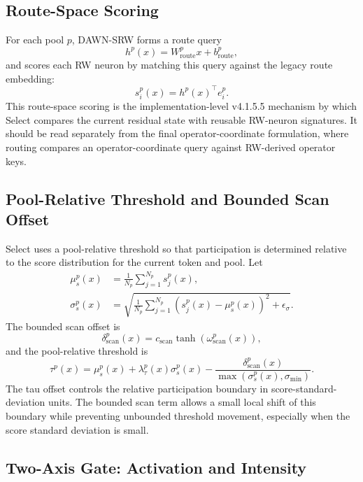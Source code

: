 \documentclass{article}
\begin{document}
\subsection{Route-Space Scoring}

For each pool $p$, DAWN-SRW forms a route query
\begin{equation}
    h^p(x)=W^p_{\mathrm{route}}x+b^p_{\mathrm{route}},
\end{equation}
and scores each RW neuron by matching this query against the legacy route embedding:
\begin{equation}
    s_i^p(x)=h^p(x)^\top e_i^p .
\end{equation}
This route-space scoring is the implementation-level v4.1.5.5 mechanism by which Select compares the current residual state with reusable RW-neuron signatures. It should be read separately from the final operator-coordinate formulation, where routing compares an operator-coordinate query against RW-derived operator keys.

\subsection{Pool-Relative Threshold and Bounded Scan Offset}

Select uses a pool-relative threshold so that participation is determined relative to the score distribution for the current token and pool. Let
\begin{align}
    \mu_s^p(x) &= \frac{1}{N_p}\sum_{j=1}^{N_p}s_j^p(x), \\
    \sigma_s^p(x) &= \sqrt{\frac{1}{N_p}\sum_{j=1}^{N_p}(s_j^p(x)-\mu_s^p(x))^2+\epsilon_\sigma} .
\end{align}
The bounded scan offset is
\begin{equation}
    \delta_{\mathrm{scan}}^p(x)
    = c_{\mathrm{scan}}\tanh(\omega_{\mathrm{scan}}^p(x)),
\end{equation}
and the pool-relative threshold is
\begin{equation}
    \tau^p(x)
    = \mu_s^p(x) + \lambda_\tau^p(x)\sigma_s^p(x)
      - \frac{\delta_{\mathrm{scan}}^p(x)}{\max(\sigma_s^p(x),\sigma_{\min})} .
\end{equation}
The tau offset controls the relative participation boundary in score-standard-deviation units. The bounded scan term allows a small local shift of this boundary while preventing unbounded threshold movement, especially when the score standard deviation is small.

\subsection{Two-Axis Gate: Activation and Intensity}
\end{document}
